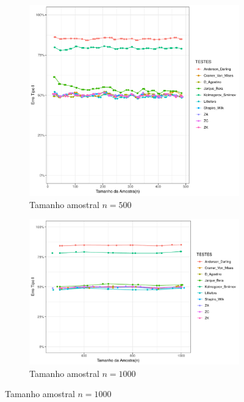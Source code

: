 \documentclass[a4paper,11pt]{article} %
\begin{document}
\begin{figure}[H]
    \vspace{0.5cm} %
    \begin{subfigure}[b]{0.45\textwidth}
        \centering
        \includegraphics[width=\textwidth]{Distribuição Normal/Erro Tipo I/erro_tipo_I_normal_500.pdf}
        \caption{Tamanho amostral \(n = 500\)}
        \label{fig:normal_500}
    \end{subfigure}
    \hfill
    \begin{subfigure}[b]{0.45\textwidth}
        \centering
        \includegraphics[width=\textwidth]{Distribuição Normal/Erro Tipo I/erro_tipo_I_normal_1000.pdf}
        \caption{Tamanho amostral \(n = 1000\)}
        \label{fig:normal_1000}
    \end{subfigure}
\end{figure}
\end{document}
